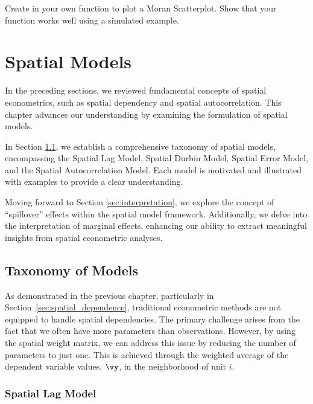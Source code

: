 \documentclass[english,12pt]{book}\usepackage[]{graphicx}\usepackage[]{xcolor}
\begin{document}
\begin{exercises}
	
	\exercise  Create in  your own function to plot a Moran Scatterplot. Show that your function works well using a simulated example. 
\end{exercises}


\chapter{Spatial Models}

In the preceding sections, we reviewed fundamental concepts of spatial econometrics, such as spatial dependency and spatial autocorrelation. This chapter advances our understanding by examining the formulation of spatial models.

In Section \ref{sec:taxonomy}, we establish a comprehensive taxonomy of spatial models, encompassing the Spatial Lag Model, Spatial Durbin Model, Spatial Error Model, and the Spatial Autocorrelation Model. Each model is motivated and illustrated with examples to provide a clear understanding.

Moving forward to Section \ref{sec:interpretation}, we explore the concept of ``spillover'' effects within the spatial model framework. Additionally, we delve into the interpretation of marginal effects, enhancing our ability to extract meaningful insights from spatial econometric analyses.

\section{Taxonomy of Models}\label{sec:taxonomy}

As demonstrated in the previous chapter, particularly in Section~\ref{sec:spatial_dependence}, traditional econometric methods are not equipped to handle spatial dependencies. The primary challenge arises from the fact that we often have more parameters than observations. However, by using the spatial weight matrix, we can address this issue by reducing the number of parameters to just one. This is achieved through the weighted average of the dependent variable values, $\vy$, in the neighborhood of unit $i$.

\subsection{Spatial Lag Model}
\end{document}
